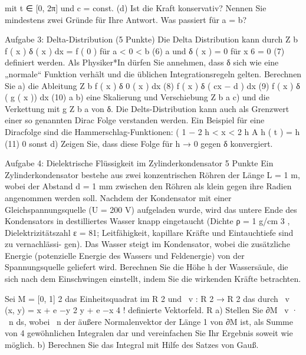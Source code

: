mit t ∈ [0, 2π] und c = const.
(d) Ist die Kraft konservativ? Nennen Sie mindestens zwei Gründe für Ihre Antwort. Was
passiert für a = b?



Aufgabe 3: Delta-Distribution
(5 Punkte)
Die Delta Distribution kann durch
Z b
f ( x ) δ ( x ) dx = f ( 0 )
für
a < 0 < b
(6)
a
und
δ ( x ) = 0
für
x 6 = 0
(7)
definiert werden. Als Physiker*In dürfen Sie annehmen, dass δ sich wie eine „normale“
Funktion verhält und die üblichen Integrationsregeln gelten. Berechnen Sie
a) die Ableitung
Z b
f ( x ) δ 0 ( x ) dx (8)
f ( x ) δ ( cx − d ) dx (9)
f ( x ) δ ( g ( x )) dx (10)
a
b) eine Skalierung und Verschiebung
Z b
a
c) und die Verkettung mit g
Z b
a
von δ. Die Delts-Distribution kann auch als Grenzwert einer so genannten Dirac Folge
verstanden werden. Ein Beispiel für eine Diracfolge sind die Hammerschlag-Funktionen:
(
1
− 2 h < x < 2 h
A h ( t ) = h
(11)
0 sonst
d) Zeigen Sie, dass diese Folge für h → 0 gegen δ konvergiert.


Aufgabe 4:
Dielektrische Flüssigkeit im Zylinderkondensator
5 Punkte
Ein Zylinderkondensator bestehe aus zwei konzentrischen Röhren der Länge L = 1 m, wobei der
Abstand d = 1 mm zwischen den Röhren als klein gegen ihre Radien angenommen werden soll.
Nachdem der Kondensator mit einer Gleichspannungsquelle (U = 200 V) aufgeladen wurde, wird
das untere Ende des Kondensators in destilliertes Wasser knapp eingetaucht (Dichte ρ = 1 g/cm 3 ,
Dielektrizitätszahl ε = 81; Leitfähigkeit, kapillare Kräfte und Eintauchtiefe sind zu vernachlässi-
gen). Das Wasser steigt im Kondensator, wobei die zusätzliche Energie (potenzielle Energie des
Wassers und Feldenergie) von der Spannungsquelle geliefert wird.
Berechnen Sie die Höhe h der Wassersäule, die sich nach dem Einschwingen einstellt, indem Sie die
wirkenden Kräfte betrachten.


Sei M = [0, 1] 2 das Einheitsquadrat im R 2 und ~v : R 2 → R 2 das durch
~v (x, y) =
x + e −y 2
y + e −x 4
!
definierte Vektorfeld.
R
a) Stellen Sie ∂M ~v · ~n ds, wobei ~n der äußere Normalenvektor der Länge 1 von
∂M ist, als Summe von 4 gewöhnlichen Integralen dar und vereinfachen Sie
Ihr Ergebnis soweit wie möglich.
b) Berechnen Sie das Integral mit Hilfe des Satzes von Gauß.
